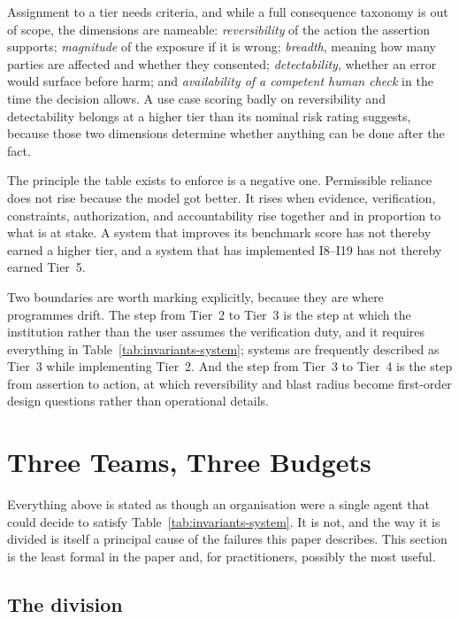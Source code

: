 \documentclass[11pt]{article}
\theoremstyle{plain}
\theoremstyle{definition}
\begin{document}
Assignment to a tier needs criteria, and while a full consequence taxonomy is out of
scope, the dimensions are nameable: \emph{reversibility} of the action the assertion
supports; \emph{magnitude} of the exposure if it is wrong; \emph{breadth}, meaning how
many parties are affected and whether they consented; \emph{detectability}, whether an
error would surface before harm; and \emph{availability of a competent human check} in
the time the decision allows. A use case scoring badly on reversibility and
detectability belongs at a higher tier than its nominal risk rating suggests, because
those two dimensions determine whether anything can be done after the fact.

The principle the table exists to enforce is a negative one. Permissible reliance
does not rise because the model got better. It rises when evidence, verification,
constraints, authorization, and accountability rise together and in proportion to
what is at stake. A system that improves its benchmark score has not thereby earned
a higher tier, and a system that has implemented I8--I19 has not thereby earned
Tier~5.

Two boundaries are worth marking explicitly, because they are where programmes
drift. The step from Tier~2 to Tier~3 is the step at which the institution rather
than the user assumes the verification duty, and it requires everything in
Table~\ref{tab:invariants-system}; systems are frequently described as Tier~3 while
implementing Tier~2. And the step from Tier~3 to Tier~4 is the step from assertion
to action, at which reversibility and blast radius become first-order design
questions rather than operational details.


\section{Three Teams, Three Budgets}
\label{sec:three-teams}

Everything above is stated as though an organisation were a single agent that could
decide to satisfy Table~\ref{tab:invariants-system}. It is not, and the way it is
divided is itself a principal cause of the failures this paper describes. This
section is the least formal in the paper and, for practitioners, possibly the most
useful.

\subsection{The division}
\end{document}
